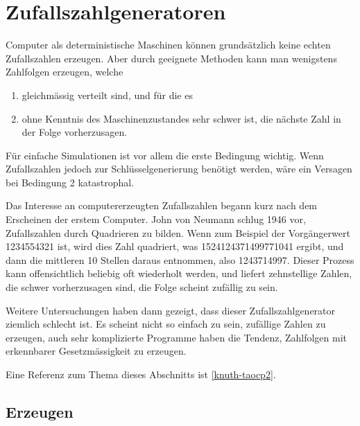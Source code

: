 %
%
%
\chapter{Zufallszahlgeneratoren}
Computer als deterministische Maschinen können grundsätzlich keine
echten Zufallszahlen erzeugen.
Aber durch geeignete Methoden kann man
wenigstens Zahlfolgen erzeugen, welche 
\begin{enumerate}
\item gleichmässig verteilt sind, und für die es
\item ohne Kenntnis des Maschinenzustandes
sehr schwer ist, die nächste Zahl in der Folge vorherzusagen.
\end{enumerate}
Für einfache Simulationen ist vor allem die erste Bedingung wichtig.
Wenn Zufallszahlen jedoch zur Schlüsselgenerierung benötigt werden,
wäre ein Versagen bei Bedingung 2 katastrophal.

Das Interesse an computererzeugten Zufallszahlen begann kurz nach dem
Erscheinen der erstem Computer.
John von Neumann schlug 1946
vor, Zufallszahlen durch Quadrieren zu bilden.
Wenn zum Beispiel
der Vorgängerwert 1234554321 ist, wird dies Zahl quadriert, was
1524124371499771041 ergibt, und dann die mittleren 10 Stellen
daraus entnommen, also 1243714997.
Dieser Prozess kann offensichtlich
beliebig oft wiederholt werden, und liefert zehnstellige Zahlen, die
schwer vorherzusagen sind, die Folge scheint zufällig zu sein.

Weitere Untersuchungen haben dann gezeigt, dass dieser Zufallszahlgenerator
ziemlich schlecht ist.
Es scheint nicht so einfach zu sein, zufällige
Zahlen zu erzeugen, auch sehr komplizierte Programme haben die Tendenz,
Zahlfolgen mit erkennbarer Gesetzmässigkeit zu erzeugen.

Eine Referenz zum Thema dieses Abschnitts ist \ref{knuth-taocp2}.

\section{Erzeugen}
